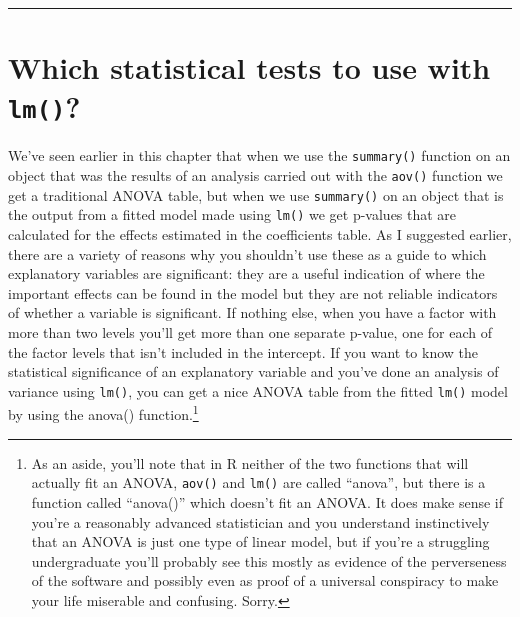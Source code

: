 \documentclass[
]{book}
\begin{document}
\begin{center}\rule{0.5\linewidth}{0.5pt}\end{center}

\hypertarget{which-statistical-tests-to-use-with-lm}{%
\section{\texorpdfstring{Which statistical tests to use with \texttt{lm()}?}{Which statistical tests to use with lm()?}}\label{which-statistical-tests-to-use-with-lm}}

We've seen earlier in this chapter that when we use the \texttt{summary()} function on an object that was the results of an analysis carried out with the \texttt{aov()} function we get a traditional ANOVA table, but when we use \texttt{summary()} on an object that is the output from a fitted model made using \texttt{lm()} we get p-values that are calculated for the effects estimated in the coefficients table. As I suggested earlier, there are a variety of reasons why you shouldn't use these as a guide to which explanatory variables are significant: they are a useful indication of where the important effects can be found in the model but they are not reliable indicators of whether a variable is significant. If nothing else, when you have a factor with more than two levels you'll get more than one separate p-value, one for each of the factor levels that isn't included in the intercept. If you want to know the statistical significance of an explanatory variable and you've done an analysis of variance using \texttt{lm()}, you can get a nice ANOVA table from the fitted \texttt{lm()} model by using the anova() function.\footnote{As an aside, you'll note that in R neither of the two functions that will actually fit an ANOVA, \texttt{aov()} and \texttt{lm()} are called ``anova'', but there is a function called ``anova()'' which doesn't fit an ANOVA. It does make sense if you're a reasonably advanced statistician and you understand instinctively that an ANOVA is just one type of linear model, but if you're a struggling undergraduate you'll probably see this mostly as evidence of the perverseness of the software and possibly even as proof of a universal conspiracy to make your life miserable and confusing. Sorry.}
\end{document}

